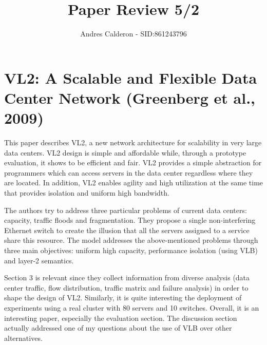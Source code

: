 \documentclass[a4paper,10pt]{scrartcl}
\title{Paper Review 5/2}
\author{Andres Calderon - SID:861243796}
\begin{document}
\maketitle
\thispagestyle{empty}

\section*{VL2: A Scalable and Flexible Data Center Network (Greenberg et al., 2009)}
This paper describes VL2, a new network architecture for scalability in very large data centers.  VL2 design is simple and affordable while, through a prototype evaluation, it shows to be efficient
and fair. VL2 provides a simple abstraction for programmers which can access servers in the data center regardless where they are located.  In addition, 
VL2 enables agility and high utilization at the same time that provides isolation and uniform high bandwidth.

The authors try to address three particular problems of current data centers: capacity, traffic floods and fragmentation. They propose a single non-interfering 
Ethernet switch to create the illusion that all the servers assigned to a service share this resource.  The model addresses the above-mentioned problems through 
three main objectives: uniform high capacity, performance isolation (using VLB) and layer-2 semantics.

Section 3 is relevant since they collect information from diverse analysis (data center traffic, flow distribution, traffic matrix and failure analysis) in order to shape the design of VL2. Similarly,  it is quite interesting the deployment of experiments using a real cluster with 80 servers and 10 switches. Overall, it is an interesting paper, especially the evaluation section.  The discussion section actually addressed one of my questions about the use of VLB over other alternatives.

\end{document}

